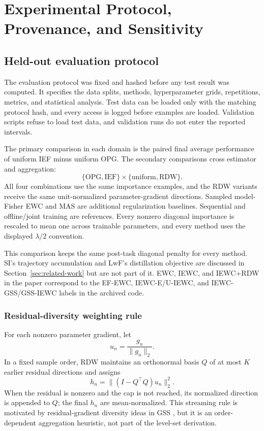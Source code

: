 \section{Experimental Protocol, Provenance, and Sensitivity}

\subsection{Held-out evaluation protocol}

The evaluation protocol was fixed and hashed before any test result was computed. It specifies the data splits, methods, hyperparameter grids, repetitions, metrics, and statistical analysis. Test data can be loaded only with the matching protocol hash, and every access is logged before examples are loaded. Validation scripts refuse to load test data, and validation runs do not enter the reported intervals.

The primary comparison in each domain is the paired final average performance of uniform IEF minus uniform OPG. The secondary comparisons cross estimator and aggregation:
\[
\{\mathrm{OPG},\mathrm{IEF}\}
\times
\{\mathrm{uniform},\mathrm{RDW}\}.
\]
All four combinations use the same importance examples, and the RDW variants receive the same unit-normalized parameter-gradient directions. Sampled model-Fisher EWC and MAS \citep{MAS} are additional regularization baselines. Sequential and offline/joint training are references. Every nonzero diagonal importance is rescaled to mean one across trainable parameters, and every method uses the displayed $\lambda/2$ convention.

This comparison keeps the same post-task diagonal penalty for every method. SI's trajectory accumulation and LwF's distillation objective are discussed in Section~\ref{sec:related-work} but are not part of it. EWC, IEWC, and IEWC+RDW in the paper correspond to the EF-EWC, IEWC-E/U-IEWC, and IEWC-GSS/GSS-IEWC labels in the archived code.

\subsubsection{Residual-diversity weighting rule}
\label{app:rdw-rule}

For each nonzero parameter gradient, let
\[
u_n=\frac{g_n}{\|g_n\|_2}.
\]
In a fixed sample order, RDW maintains an orthonormal basis $Q$ of at most $K$ earlier residual directions and assigns
\[
h_n=\|(I-Q^\top Q)u_n\|_2^2.
\]
When the residual is nonzero and the cap is not reached, its normalized direction is appended to $Q$; the final $h_n$ are mean-normalized. This streaming rule is motivated by residual-gradient diversity ideas in GSS \citep{GSS}, but it is an order-dependent aggregation heuristic, not part of the level-set derivation.

